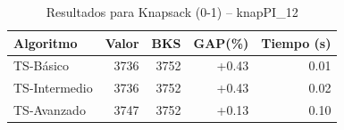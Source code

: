 \begin{table}[h]
\centering
\caption{Resultados para Knapsack (0-1) -- knapPI_12}
\label{tab:knapsack_knapPI_12}
\begin{tabular}{lrrrr}
\hline
\textbf{Algoritmo} & \textbf{Valor} & \textbf{BKS} & \textbf{GAP(\%)} & \textbf{Tiempo (s)} \\
\hline
TS-Básico & 3736 & 3752 & +0.43 & 0.01 \\
TS-Intermedio & 3736 & 3752 & +0.43 & 0.02 \\
TS-Avanzado & 3747 & 3752 & +0.13 & 0.10 \\
\hline
\end{tabular}
\end{table}
